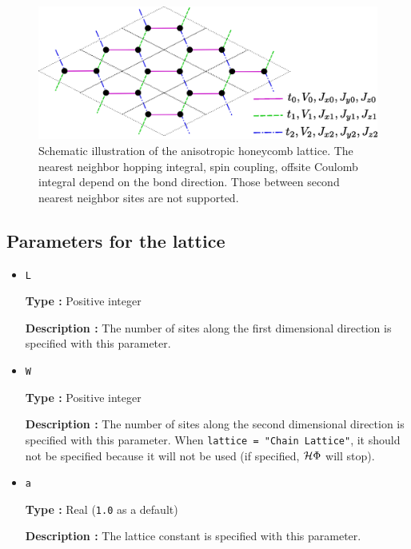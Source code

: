 \begin{itemize}
\begin{figure}[!htbp]
  \begin{center}
    \includegraphics[width=15cm]{../figs/chap04_1_honeycomb.eps}
    \caption{Schematic illustration of the anisotropic honeycomb lattice.
      The nearest neighbor 
      hopping integral, spin coupling, offsite Coulomb integral
      depend on the bond direction.
      Those between second nearest neighbor sites are not supported.
    }
    \label{fig_chap04_1_honeycomb}
  \end{center}
\end{figure}

\end{itemize}

\subsection{Parameters for the lattice}

\begin{itemize}
\item \verb|L|

{\bf Type :} Positive integer

{\bf Description :} The number of
sites along the first dimensional direction
is specified with this parameter.

\item \verb|W|

{\bf Type :} Positive integer

{\bf Description :} The number of
sites along the second dimensional direction
is specified with this parameter.
When \verb|lattice = "Chain Lattice"|, 
it should not be specified because it will not be used
(if specified, $\mathcal{H} \Phi$ will stop).

\item \verb|a|

{\bf Type :} Real (\verb|1.0| as a default)

{\bf Description :} The lattice constant is specified with this parameter.
\end{itemize}

